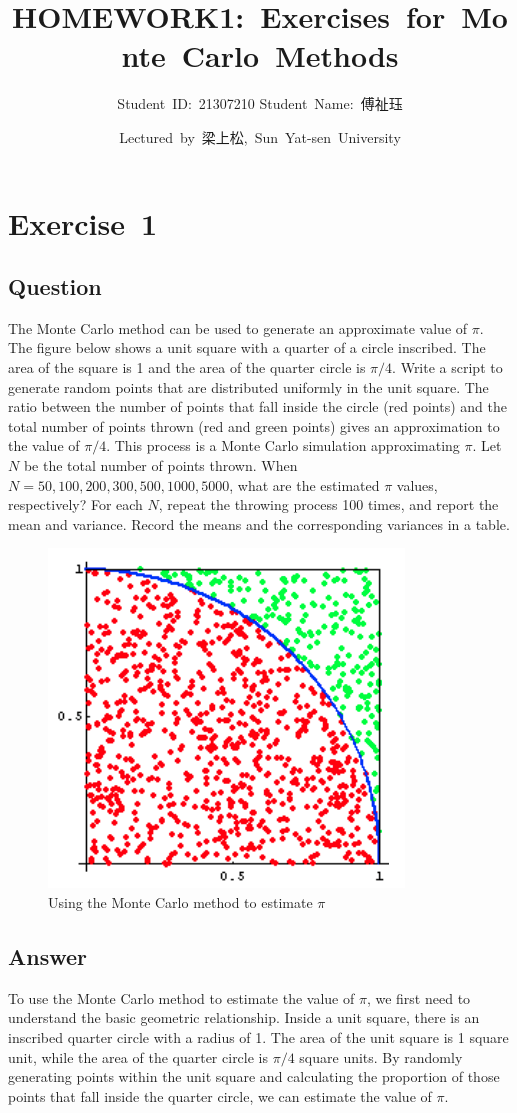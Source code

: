 \documentclass[a4paper, utf8]{ctexart}
\title{\songti \Large \textbf{HOMEWORK1:\ Exercises\ for\ Monte\ Carlo\ Methods}}
\author{Student\ ID:\ 21307210 \qquad Student\ Name:\ 傅祉珏}
\date{Lectured\ by\ 梁上松,\ Sun\ Yat-sen\ University}
\begin{document}
	
	\maketitle
	
	\section{Exercise\ 1}
	
	\subsection{Question}
	
	The Monte Carlo method can be used to generate an approximate value of $\pi$. The figure below shows a unit square with a quarter of a circle inscribed. The area of the square is 1 and the area of the quarter circle is $\pi/4$. Write a script to generate random points that are distributed uniformly in the unit square. The ratio between the number of points that fall inside the circle (red points) and the total number of points thrown (red and green points) gives an approximation to the value of $\pi/4$. This process is a Monte Carlo simulation approximating $\pi$. Let $N$ be the total number of points thrown. When $N=50, 100, 200, 300, 500, 1000, 5000$, what are the estimated $\pi$ values, respectively? For each $N$, repeat the throwing process 100 times, and report the mean and variance. Record the means and the corresponding variances in a table. 
	
	\begin{figure}[htbp]
		\centering
		\includegraphics[width=.4\textwidth]{./figure/figure1.png}
		\caption{Using the Monte Carlo method to estimate $\pi$}
	\end{figure}
	
	\subsection{Answer}
	
	To use the Monte Carlo method to estimate the value of $\pi$, we first need to understand the basic geometric relationship. Inside a unit square, there is an inscribed quarter circle with a radius of 1. The area of the unit square is 1 square unit, while the area of the quarter circle is $\pi/4$ square units. By randomly generating points within the unit square and calculating the proportion of those points that fall inside the quarter circle, we can estimate the value of $\pi$.
	
\end{document}

